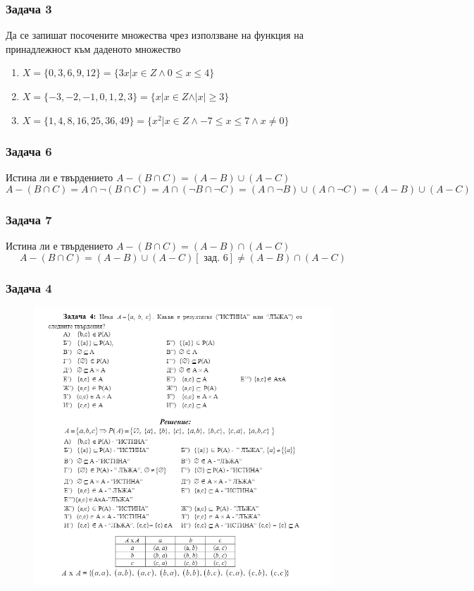 \documentclass[fleqn, 12pt]{article}
\theoremstyle{definition}
\begin{document}
\subsubsection*{Задача 3}
Да  се  запишат  посочените  множества  чрез  използване  на  функция  на принадлежност към даденото множество
\begin{enumerate}
\item $X = \{0,3,6,9,12 \} = \{3x \vert x \in Z  \land 0 \leq x \leq 4 \}$
\item $X = \{-3,-2,-1,0,1,2,3 \} = \{x \vert x \in Z  \land \vert x \vert \geq 3 \}$
\item $X =\{1,4,8,16,25,36,49 \} = \{x^2 \vert x \in Z \land  -7 \leq x \leq 7 \land x \neq 0\}$
\end{enumerate}
\subsubsection*{Задача 6}
Истина ли е твърдението $A - (B \cap C) = (A-B) \cup (A - C)$
$$A - (B \cap C) = A \cap \neg(B \cap C) = A \cap ( \neg B \cap  \neg C) = (A \cap \neg B) \cup (A \cap  \neg C) = (A-B) \cup (A - C)$$
\subsubsection*{Задача 7}
Истина ли е твърдението $A - (B \cap C) = (A-B) \cap (A - C)$
$$A - (B \cap C) = (A-B) \cup (A - C) [\text{ зад. 6}] \neq (A-B) \cap (A - C) $$
\newpage
\subsubsection*{Задача 4}
\begin{figure}[h!]
\includegraphics{Pics/Discrete math/ex3/ex3-task4.png}
\end{figure}
\end{document}
